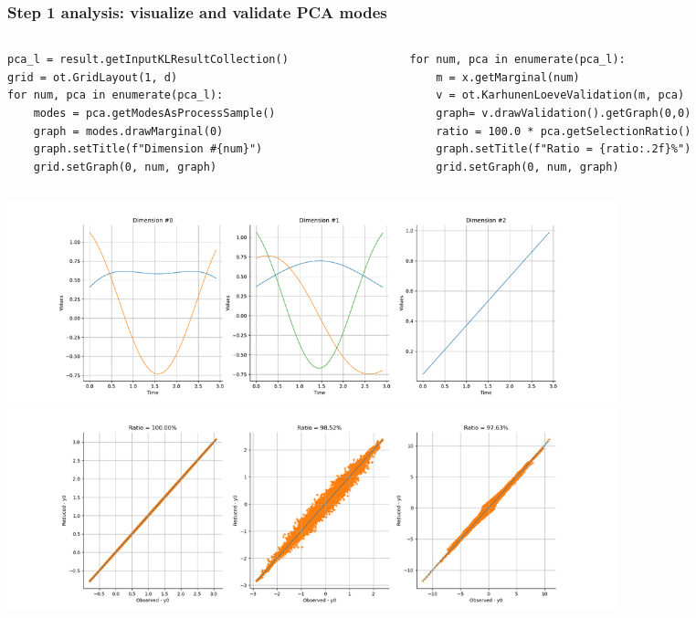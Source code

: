 \documentclass{beamer}
\begin{document}
\begin{frame}[containsverbatim]
\frametitle{Step 1 analysis: visualize and validate PCA modes}
\vspace{-0.3cm}
\begin{columns}
  \begin{column}{0.49\textwidth}
  \begin{lstlisting}
pca_l = result.getInputKLResultCollection()
grid = ot.GridLayout(1, d)
for num, pca in enumerate(pca_l):
    modes = pca.getModesAsProcessSample()
    graph = modes.drawMarginal(0)
    graph.setTitle(f"Dimension #{num}")
    grid.setGraph(0, num, graph)
  \end{lstlisting}    
  \end{column}
  \begin{column}{0.49\textwidth}
    \begin{lstlisting}
for num, pca in enumerate(pca_l):
    m = x.getMarginal(num)
    v = ot.KarhunenLoeveValidation(m, pca)
    graph= v.drawValidation().getGraph(0,0)
    ratio = 100.0 * pca.getSelectionRatio()
    graph.setTitle(f"Ratio = {ratio:.2f}%")
    grid.setGraph(0, num, graph)
    \end{lstlisting}    
    \end{column}  
\end{columns}

\vspace{-0.52cm}
\centering
\includegraphics[width=0.775\textwidth]{figures/pca_modes.pdf}
\includegraphics[width=0.775\textwidth]{figures/pca_validation.png}

\end{frame}
  
  
  
  
\end{document}
